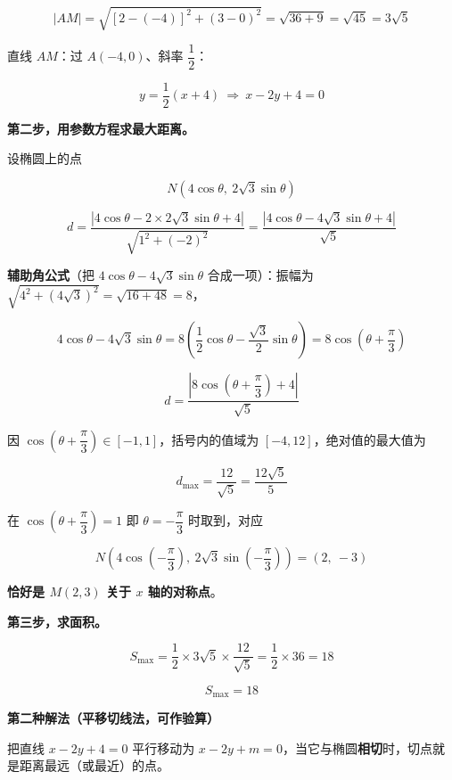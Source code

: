 \begin{answer}
\nopagebreak[4]
\[|AM|=\sqrt{\left[2-(-4)\right]^{2}+(3-0)^{2}}=\sqrt{36+9}=\sqrt{45}=3\sqrt5\]

直线 $AM$：过 $A(-4,0)$、斜率 $\dfrac12$：

\nopagebreak[4]
\[y=\frac12(x+4)\ \Longrightarrow\ x-2y+4=0\]

\textbf{第二步，用参数方程求最大距离。}

设椭圆上的点

\nopagebreak[4]
\[N\left(4\cos\theta,\ 2\sqrt3\sin\theta\right)\]

\nopagebreak[4]
\[d=\frac{\left|4\cos\theta-2\times2\sqrt3\sin\theta+4\right|}{\sqrt{1^{2}+(-2)^{2}}}=\frac{\left|4\cos\theta-4\sqrt3\sin\theta+4\right|}{\sqrt5}\]

\textbf{辅助角公式}（把 $4\cos\theta-4\sqrt3\sin\theta$ 合成一项）：振幅为 $\sqrt{4^{2}+\left(4\sqrt3\right)^{2}}=\sqrt{16+48}=8$，

\nopagebreak[4]
\[4\cos\theta-4\sqrt3\sin\theta=8\left(\frac12\cos\theta-\frac{\sqrt3}2\sin\theta\right)=8\cos\left(\theta+\frac\pi3\right)\]

\nopagebreak[4]
\[d=\frac{\left|8\cos\left(\theta+\dfrac\pi3\right)+4\right|}{\sqrt5}\]

因 $\cos\left(\theta+\dfrac\pi3\right)\in[-1,1]$，括号内的值域为 $[-4,12]$，绝对值的最大值为

\nopagebreak[4]
\[d_{\max}=\frac{12}{\sqrt5}=\frac{12\sqrt5}5\]

在 $\cos\left(\theta+\dfrac\pi3\right)=1$ 即 $\theta=-\dfrac\pi3$ 时取到，对应

\nopagebreak[4]
\[N\left(4\cos\left(-\frac\pi3\right),\ 2\sqrt3\sin\left(-\frac\pi3\right)\right)=(2,\ -3)\]

\textbf{恰好是 $M(2,3)$ 关于 $x$ 轴的对称点}。

\textbf{第三步，求面积。}

\nopagebreak[4]
\[S_{\max}=\frac12\times3\sqrt5\times\frac{12}{\sqrt5}=\frac12\times36=18\]

\nopagebreak[4]
\[\boxed{S_{\max}=18}\]

\par\medskip

\textbf{第二种解法（平移切线法，可作验算）}

把直线 $x-2y+4=0$ 平行移动为 $x-2y+m=0$，当它与椭圆\textbf{相切}时，切点就是距离最远（或最近）的点。


\end{answer}
